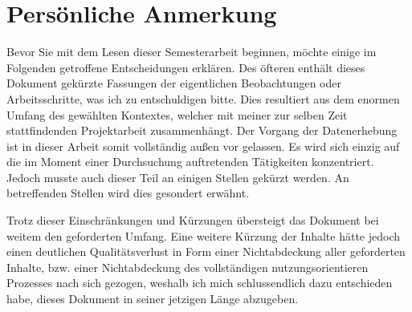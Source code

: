 \chapter*{Persönliche Anmerkung}

Bevor Sie mit dem Lesen dieser Semesterarbeit beginnen, möchte einige im Folgenden getroffene Entscheidungen erklären.
Des öfteren enthält dieses Dokument gekürzte Fassungen der eigentlichen Beobachtungen oder Arbeitsschritte, was ich zu entschuldigen bitte.
Dies resultiert aus dem enormen Umfang des gewählten Kontextes, welcher mit meiner zur selben Zeit stattfindenden Projektarbeit zusammenhängt.
Der Vorgang der Datenerhebung ist in dieser Arbeit somit vollständig außen vor gelassen.
Es wird sich einzig auf die im Moment einer Durchsuchung auftretenden Tätigkeiten konzentriert.
Jedoch musste auch dieser Teil an einigen Stellen gekürzt werden.
An betreffenden Stellen wird dies gesondert erwähnt.

Trotz dieser Einschränkungen und Kürzungen übersteigt das Dokument bei weitem den geforderten Umfang.
Eine weitere Kürzung der Inhalte hätte jedoch einen deutlichen Qualitätsverlust in Form einer Nichtabdeckung aller geforderten Inhalte, bzw. einer Nichtabdeckung des vollständigen nutzungsorientieren Prozesses nach sich gezogen, weshalb ich mich schlussendlich dazu entschieden habe, dieses Dokument in seiner jetzigen Länge abzugeben.